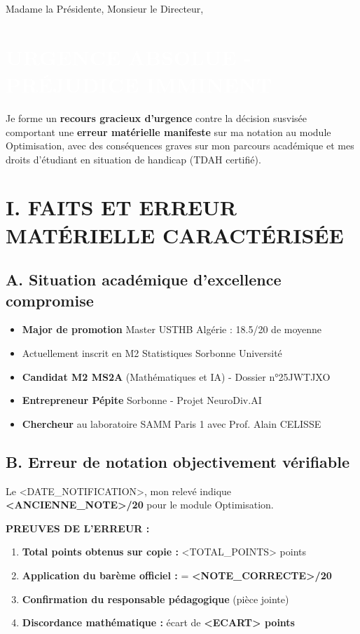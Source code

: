 \documentclass[12pt,french]{scrlttr2}
\begin{document}
\begin{letter}
\vspace{0.5cm}

Madame la Présidente, Monsieur le Directeur,

\section*{\colorbox{red!20}{\textcolor{white}{\textbf{URGENCE ABSOLUE - PRÉJUDICE IMMINENT}}}}

Je forme un \textbf{recours gracieux d'urgence} contre la décision susvisée comportant une \textbf{erreur matérielle manifeste} sur ma notation au module Optimisation, avec des conséquences graves sur mon parcours académique et mes droits d'étudiant en situation de handicap (TDAH certifié).

\section*{I. FAITS ET ERREUR MATÉRIELLE CARACTÉRISÉE}

\subsection*{A. Situation académique d'excellence compromise}

\begin{itemize}[leftmargin=*]
\item \textbf{Major de promotion} Master USTHB Algérie : \colorbox{green!20}{18.5/20 de moyenne}
\item Actuellement inscrit en M2 Statistiques Sorbonne Université
\item \textbf{Candidat M2 MS2A} (Mathématiques et IA) - Dossier n°25JWTJXO
\item \textbf{Entrepreneur Pépite} Sorbonne - Projet NeuroDiv.AI
\item \textbf{Chercheur} au laboratoire SAMM Paris 1 avec Prof. Alain CELISSE
\end{itemize}

\subsection*{B. Erreur de notation objectivement vérifiable}

Le <DATE_NOTIFICATION>, mon relevé indique \colorbox{red!20}{\textbf{<ANCIENNE_NOTE>/20}} pour le module Optimisation.

\textbf{PREUVES DE L'ERREUR :}
\begin{enumerate}
\item \textbf{Total points obtenus sur copie :} <TOTAL_POINTS> points
\item \textbf{Application du barème officiel :} = \colorbox{green!20}{\textbf{<NOTE_CORRECTE>/20}}
\item \textbf{Confirmation du responsable pédagogique} (pièce jointe)
\item \textbf{Discordance mathématique :} écart de \textbf{<ECART> points}
\end{enumerate}


\end{letter}
\end{document}
